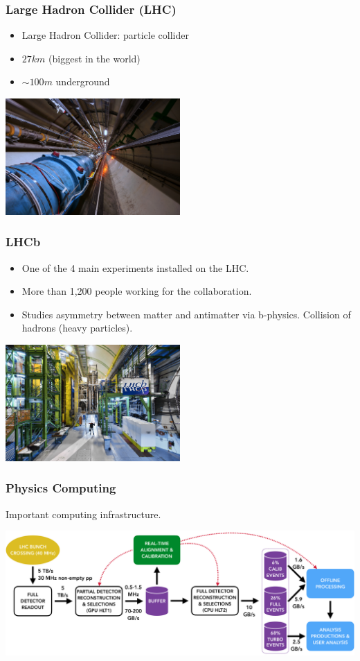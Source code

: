 \documentclass{beamer}
\begin{document}
    \begin{frame}
        \frametitle{Large Hadron Collider (LHC)}

        \begin{itemize}
            \item Large Hadron Collider: particle collider
            \item $ 27 km $ (biggest in the world)
            \item $ \sim 100 m $ underground
        \end{itemize}

        \includegraphics[width=0.5\textwidth]{LHC.jpg}
    \end{frame}

    \begin{frame}
        \frametitle{LHCb}

        \begin{itemize}
            \item One of the 4 main experiments installed on the LHC.
            \item More than 1,200 people working for the collaboration.
            \item Studies asymmetry between matter and antimatter via b-physics.
            Collision of hadrons (heavy particles).
        \end{itemize}

        \includegraphics[width=0.5\textwidth]{LHCb.jpg}
    \end{frame}

    \begin{frame}
        \frametitle{Physics Computing}

        Important computing infrastructure.

        \includegraphics[width=\textwidth]{LHCb_stack.png}
    \end{frame}
\end{document}

